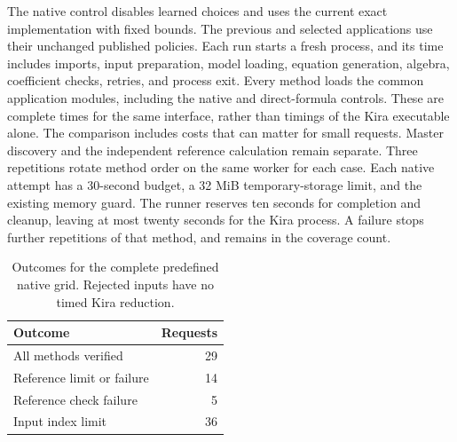 The native control disables learned choices and uses the current exact implementation with fixed bounds. The previous and selected applications use their unchanged published policies. Each run starts a fresh process, and its time includes imports, input preparation, model loading, equation generation, algebra, coefficient checks, retries, and process exit. Every method loads the common application modules, including the native and direct-formula controls. These are complete times for the same interface, rather than timings of the Kira executable alone. The comparison includes costs that can matter for small requests. Master discovery and the independent reference calculation remain separate. Three repetitions rotate method order on the same worker for each case. Each native attempt has a 30-second budget, a 32 MiB temporary-storage limit, and the existing memory guard. The runner reserves ten seconds for completion and cleanup, leaving at most twenty seconds for the Kira process. A failure stops further repetitions of that method, and remains in the coverage count.

\begin{table}[!htbp]\centering\small
\caption{Outcomes for the complete predefined native grid. Rejected inputs have no timed Kira reduction.}
\label{tab:extended-coverage}
\begin{tabular}{@{}lr@{}}\toprule
Outcome & Requests\\\midrule
All methods verified & 29\\
Reference limit or failure & 14\\
Reference check failure & 5\\
Input index limit & 36\\
\bottomrule\end{tabular}\end{table}


